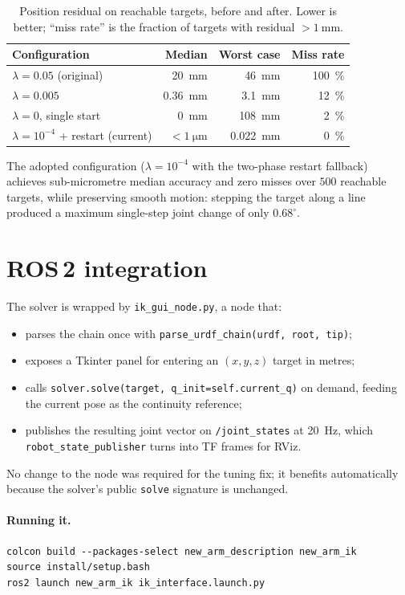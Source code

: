 \documentclass[11pt]{article}
\begin{document}
\begin{table}[h]
\centering
\caption{Position residual on reachable targets, before and after. Lower is
better; ``miss rate'' is the fraction of targets with residual
$>\SI{1}{\milli\meter}$.}
\label{tab:results}
\small
\begin{tabular}{lrrr}
\toprule
Configuration & Median & Worst case & Miss rate \\
\midrule
$\lambda=0.05$ (original)              & \SI{20}{\milli\meter}   & \SI{46}{\milli\meter} & \SI{100}{\percent} \\
$\lambda=0.005$                       & \SI{0.36}{\milli\meter} & \SI{3.1}{\milli\meter}& \SI{12}{\percent} \\
$\lambda=0$, single start             & \SI{0}{\milli\meter}    & \SI{108}{\milli\meter}& \SI{2}{\percent} \\
$\lambda=10^{-4}$ + restart (current) & $<\SI{1}{\micro\meter}$ & \SI{0.022}{\milli\meter}& \SI{0}{\percent} \\
\bottomrule
\end{tabular}
\end{table}

The adopted configuration ($\lambda=10^{-4}$ with the two-phase restart
fallback) achieves sub-micrometre median accuracy and zero misses over $500$
reachable targets, while preserving smooth motion: stepping the target along a
line produced a maximum single-step joint change of only $0.68^\circ$.

\section{ROS\,2 integration}

The solver is wrapped by \texttt{ik\_gui\_node.py}, a node that:
\begin{itemize}[leftmargin=2em]
  \item parses the chain once with \texttt{parse\_urdf\_chain(urdf, root, tip)};
  \item exposes a Tkinter panel for entering an $(x,y,z)$ target in metres;
  \item calls \texttt{solver.solve(target, q\_init=self.current\_q)} on demand,
        feeding the current pose as the continuity reference;
  \item publishes the resulting joint vector on \texttt{/joint\_states} at
        \SI{20}{\hertz}, which \texttt{robot\_state\_publisher} turns into TF
        frames for RViz.
\end{itemize}
No change to the node was required for the tuning fix; it benefits
automatically because the solver's public \texttt{solve} signature is
unchanged.

\paragraph{Running it.}
\begin{verbatim}
colcon build --packages-select new_arm_description new_arm_ik
source install/setup.bash
ros2 launch new_arm_ik ik_interface.launch.py
\end{verbatim}
\end{document}
